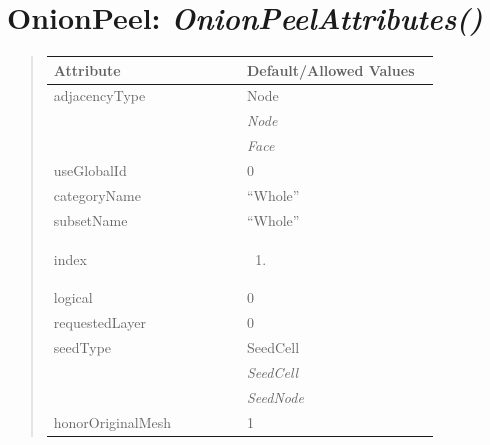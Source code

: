 \documentclass[letterpaper,10pt,english]{sphinxmanual}
\begin{document}
\begin{DUlineblock}{0em}
\item[] 
\end{DUlineblock}

\begin{DUlineblock}{0em}
\item[] 
\end{DUlineblock}


\section{\textbf{OnionPeel}: \emph{OnionPeelAttributes()}}
\label{attributes:onionpeel-onionpeelattributes}
\begin{DUlineblock}{0em}
\item[] 
\end{DUlineblock}
\begin{quote}

\begin{tabular}{|p{0.475\linewidth}|p{0.475\linewidth}|}
\hline

\textbf{Attribute}
 & 
\textbf{Default/Allowed Values}
\\
\hline
adjacencyType
 & 
Node
\\
\hline & 
\emph{Node}
\\
\hline & 
\emph{Face}
\\
\hline
useGlobalId
 & 
0
\\
\hline
categoryName
 & 
``Whole''
\\
\hline
subsetName
 & 
``Whole''
\\
\hline
index
 & \begin{enumerate}
\item {} 
\end{enumerate}
\\
\hline
logical
 & 
0
\\
\hline
requestedLayer
 & 
0
\\
\hline
seedType
 & 
SeedCell
\\
\hline & 
\emph{SeedCell}
\\
\hline & 
\emph{SeedNode}
\\
\hline
honorOriginalMesh
 & 
1
\\
\hline\end{tabular}

\end{quote}

\begin{DUlineblock}{0em}
\item[] 
\end{DUlineblock}
\end{document}
